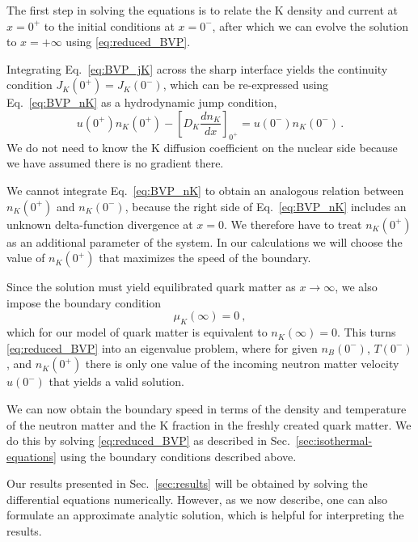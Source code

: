 \documentclass[10pt,superscriptaddress,
amsmath,aps,prc,twocolumn,nofootinbib,floatfix]{revtex4-1}
\newcommand{\mga}[1]{{\color[rgb]{0.6,0,0}#1}}
\begin{document}
The first step in solving the equations is to relate the K density and current at $x=0^+$ to the initial conditions at $x=0^-$, after which we can evolve the solution to $x=+\infty$ using \eqref{eq:reduced_BVP}.

Integrating Eq.~\eqref{eq:BVP_jK} 
across the sharp interface yields the continuity condition $J_K(0^+)=J_K(0^-)$, which can be re-expressed using Eq.~\eqref{eq:BVP_nK} as a
hydrodynamic jump condition,
\begin{equation}
 u(0^+)n_K(0^+)
 -\left[D_K\frac{dn_K}{dx}\right]_{0^+}
 =u(0^-)n_K(0^-)\,.
\label{eq:jump_K-}
\end{equation}
We do not need to know the K diffusion coefficient on the nuclear side because we have assumed there is no gradient there. 

We cannot integrate Eq.~\eqref{eq:BVP_nK} to obtain an analogous relation between $n_K(0^+)$ and $n_K(0^-)$, because \mga{the right side of Eq.~\eqref{eq:BVP_nK} includes an unknown delta-function divergence at $x=0$.}
We therefore have to treat $n_K(0^+)$ as an additional parameter of the system.
In our calculations we will choose the value of $n_K(0^+)$ that maximizes the speed of the boundary.

Since the solution must yield equilibrated quark matter as $x\to\infty$, we also impose the boundary condition 
\begin{equation}
    \mu_K(\infty)=0 \ ,
\end{equation}
which for our model of quark matter is equivalent to $n_K(\infty)=0$.
This turns \eqref{eq:reduced_BVP} into an eigenvalue problem, where for given $n_B(0^-)$, $T(0^-)$, and $n_K(0^+)$ there is only one value of the incoming neutron matter velocity $u(0^-)$ that yields a valid solution.

We can now obtain the boundary speed in terms of the density and temperature of the neutron matter and the K fraction in the freshly created quark matter.
We do this by solving \eqref{eq:reduced_BVP} as described in Sec.~\ref{sec:isothermal-equations} using the boundary conditions described above.

\mga{Our results presented in Sec.~\ref{sec:results} will be obtained by solving the differential equations numerically.}
However, as we now describe, one can also formulate an approximate analytic solution, which is helpful for interpreting the results.
\end{document}

